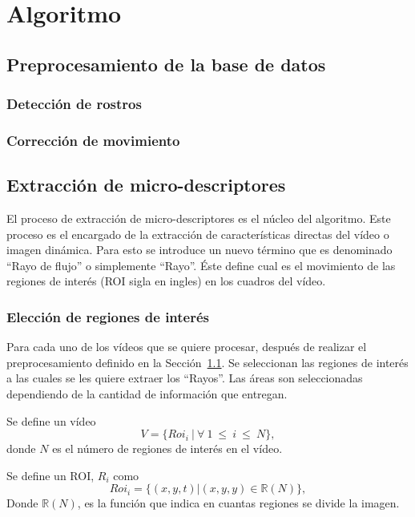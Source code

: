 \chapter[Algoritmo]{Algoritmo}
\label{ch:algoritmo}

\section{Preprocesamiento de la base de datos}
\label{sec:proc_bdd}
	\subsection{Detección de rostros}
	\label{algoritmo:det_rostro}
	
	\subsection{Corrección de movimiento}
	\label{algoritmo:cor_movimiento}

\section{Extracción de micro-descriptores}
\label{sec:micro-descriptores}
		El proceso de extracción de micro-descriptores es el núcleo del algoritmo. Este proceso es el encargado de la extracción de características directas del vídeo o imagen dinámica. Para esto se introduce un nuevo término que es denominado ``Rayo de flujo'' o simplemente ``Rayo''. Éste define cual es el movimiento de las regiones de interés (ROI sigla en ingles) en los cuadros del vídeo.

	\subsection{Elección de regiones de interés}
	\label{algoritmo:elecc_roi}
	Para cada uno de los vídeos que se quiere procesar, después de realizar el preprocesamiento definido en la Sección~\ref{sec:proc_bdd}. Se seleccionan las regiones de interés a las cuales se les quiere extraer los ``Rayos''. Las áreas son seleccionadas dependiendo de la cantidad de información que entregan. 
	
	Se define un vídeo 
	\begin{equation}\label{algoritmo:eq:video}		
		V = \{Roi_i~|~\forall ~1~\leq~i~\le~N\}, 
	\end{equation}
	donde $N$ es el número de regiones de interés en el vídeo.
	
	Se define un ROI, $R_i$ como
	\begin{equation}\label{algoritmo:eq:roi}
		Roi_i = \{(x,y,t) | (x,y,y) \in \mathds{R}(N)\},
	\end{equation}
	Donde $\mathds{R}(N)$, es la función que indica en cuantas regiones se divide la imagen.

